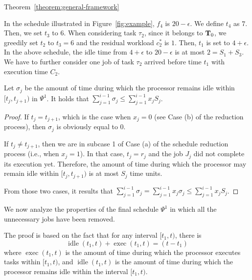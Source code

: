 \begin{appProof}{Theorem~\ref{theorem:general-framework}}
\begin{example}
In the schedule illustrated in Figure~\ref{fig:example}, $f_4$ is $20-\epsilon$.
We define $t_4$ as $7$. Then, we set $t_3$ to $6$. When considering
task $\tau_2$, since it belongs to ${\bf T}_0$, we greedily set $t_2$
to $t_3=6$ and the residual workload $c_2^*$ is $1$. Then, $t_1$ is set
to $4+\epsilon$. In the above schedule, the idle time from
$4+\epsilon$ to $20-\epsilon$ is at most $2 = S_1+S_3$. We have to
further consider one job of task $\tau_2$ arrived before time $t_1$
with execution time $C_2$.
\end{example}


\begin{Lemma}
\label{lem:max_idle}
Let $\sigma_j$ be the amount of time during which the processor remains idle within $[t_j, t_{j+1})$ in $\Psi^1$. It holds that $\sum_{j=1}^{i-1} \sigma_j \leq \sum_{j=1}^{i-1} x_j S_j$. %
\end{Lemma}
\begin{proof}
If $t_j = t_{j+1}$, which is the case when $x_j = 0$ (see Case (b) of the reduction process), then $\sigma_j$ is obviously equal to $0$. 

If $t_j \not= t_{j+1}$, then we are in subcase 1 of Case (a) of the schedule reduction process (i.e., when $x_j = 1$). In that case, $t_j = r_j$ and the job $J_j$ did not complete its execution yet. Therefore, the amount of time during which the processor may remain idle within $[t_j, t_{j+1})$ is at most $S_j$ time units. 

From those two cases, it results that $\sum_{j=1}^{i-1} \sigma_j = \sum_{j=1}^{i-1} x_j \sigma_j \leq \sum_{j=1}^{i-1} x_j S_j$.
\end{proof}



We now analyze the properties of the final schedule $\Psi^1$ in which all the unnecessary jobs have been removed. 


The proof is based on the fact that for any interval $[t_1, t)$, there is 
\begin{equation}
\label{eq:exec_plus_idle}
\operatorname{idle}(t_1, t) + \operatorname{exec}(t_1, t)  = (t - t_1)
\end{equation}
where $\operatorname{exec}(t_1, t)$ is the amount of time during which the processor executes tasks within $[t_1, t)$, and $\operatorname{idle}(t_1, t)$ is the amount of time during which the processor remains idle within the interval $[t_1, t)$.


\end{appProof}
